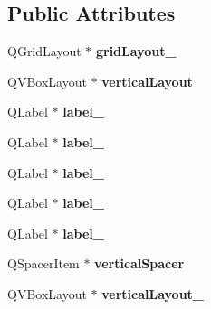 \subsection*{Public Attributes}
\begin{DoxyCompactItemize}
\item 
Q\+Grid\+Layout $\ast$ {\bfseries grid\+Layout\+\_}\hypertarget{classUi__AboutGUI_ac522d50a008561e8456fd30be7480ff1}{}\label{classUi__AboutGUI_ac522d50a008561e8456fd30be7480ff1}

\item 
Q\+V\+Box\+Layout $\ast$ {\bfseries vertical\+Layout}\hypertarget{classUi__AboutGUI_ae5d583e69298f8edcadc3fdb0d95ddc4}{}\label{classUi__AboutGUI_ae5d583e69298f8edcadc3fdb0d95ddc4}

\item 
Q\+Label $\ast$ {\bfseries label\+\_}\hypertarget{classUi__AboutGUI_a90db1c9781783e277932e3299a2c08ce}{}\label{classUi__AboutGUI_a90db1c9781783e277932e3299a2c08ce}

\item 
Q\+Label $\ast$ {\bfseries label\+\_}\hypertarget{classUi__AboutGUI_a2c486f3d2cbaf47b65e0fa9831a7f96c}{}\label{classUi__AboutGUI_a2c486f3d2cbaf47b65e0fa9831a7f96c}

\item 
Q\+Label $\ast$ {\bfseries label\+\_}\hypertarget{classUi__AboutGUI_aa8fb3ac700e821be3f0270f81e1a330f}{}\label{classUi__AboutGUI_aa8fb3ac700e821be3f0270f81e1a330f}

\item 
Q\+Label $\ast$ {\bfseries label\+\_}\hypertarget{classUi__AboutGUI_a83ad30b330037743c8bfcc935ab29a7c}{}\label{classUi__AboutGUI_a83ad30b330037743c8bfcc935ab29a7c}

\item 
Q\+Label $\ast$ {\bfseries label\+\_}\hypertarget{classUi__AboutGUI_a492d3aa2a749e8b2aebbefe965da733e}{}\label{classUi__AboutGUI_a492d3aa2a749e8b2aebbefe965da733e}

\item 
Q\+Spacer\+Item $\ast$ {\bfseries vertical\+Spacer}\hypertarget{classUi__AboutGUI_adb1f135dc49250d379d7062e5b36b59e}{}\label{classUi__AboutGUI_adb1f135dc49250d379d7062e5b36b59e}

\item 
Q\+V\+Box\+Layout $\ast$ {\bfseries vertical\+Layout\+\_}\hypertarget{classUi__AboutGUI_ab97483ef6bf2f0b1d16f1627b680a3ad}{}\label{classUi__AboutGUI_ab97483ef6bf2f0b1d16f1627b680a3ad}


\end{DoxyCompactItemize}

